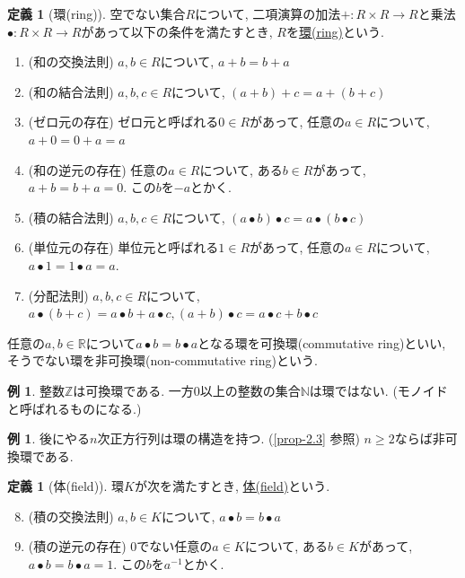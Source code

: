 \documentclass[dvipdfmx,a4paper,11pt]{article} %
\newcommand{\R}{\mathbb{R}}
\newcommand{\Z}{\mathbb{Z}}
\newcommand{\N}{\mathbb{N}}
\theoremstyle{definition}
\newtheorem{dfn}[thm]{定義}
\newtheorem{exa}[thm]{例}
\begin{document}
  \begin{dfn}[環(ring)]
空でない集合$R$について, 二項演算の加法$+ : R \times R \to R$と乗法$\bullet : R \times R \to R$があって以下の条件を満たすとき, $R$を\underline{環(ring)}という. 
\begin{enumerate}
\setlength{\parskip}{0cm}
 \setlength{\itemsep}{0pt} 
\item (和の交換法則) $a, b \in R$について, $a+b = b+a$
\item (和の結合法則) $a, b, c\in R$について, $(a+b) + c = a + (b+c)$
\item (ゼロ元の存在) ゼロ元と呼ばれる$0 \in R$があって, 任意の$a \in R$について, $a+0=0+a=a$
\item (和の逆元の存在) 任意の$a \in R$について, ある$b \in R$があって, $a + b = b+a =0$. この$b$を$-a$とかく. 
\item (積の結合法則) $a, b, c\in R$について, $(a\bullet b) \bullet c = a \bullet (b\bullet c)$
\item (単位元の存在) 単位元と呼ばれる$1\in R$があって, 任意の$a \in R$について, $a \bullet 1 =1 \bullet a =a$.
\item (分配法則) $a, b, c\in R$について, $a\bullet (b+c)=a \bullet b + a \bullet c, (a+b) \bullet c = a \bullet c +b \bullet c$
\end{enumerate}

任意の$a, b \in \R$について$a \bullet b=b \bullet a$となる環を可換環(commutative ring)といい, そうでない環を非可換環(non-commutative ring)という. 
\end{dfn}

\begin{exa}
整数$\Z$は可換環である. 
一方0以上の整数の集合$\N$は環ではない. (モノイドと呼ばれるものになる.)
\end{exa}

\begin{exa}
後にやる$n$次正方行列は環の構造を持つ.
(\ref{prop-2.3} 参照) $n \ge 2$ならば非可換環である. 
\end{exa}

  \begin{dfn}[体(field)]
  環$K$が次を満たすとき, \underline{体(field)}という. 
  \begin{enumerate}
  \setcounter{enumi}{7}
\setlength{\parskip}{0cm}
 \setlength{\itemsep}{0pt} 
\item (積の交換法則) $a, b \in K$について, $a \bullet b=b \bullet a$
\item (積の逆元の存在) 0でない任意の$a \in K$について, ある$b \in K$があって, $a \bullet b = b \bullet a =1$. この$b$を$a^{-1}$とかく. 
 \end{enumerate}
  \end{dfn}
  
\end{document}
